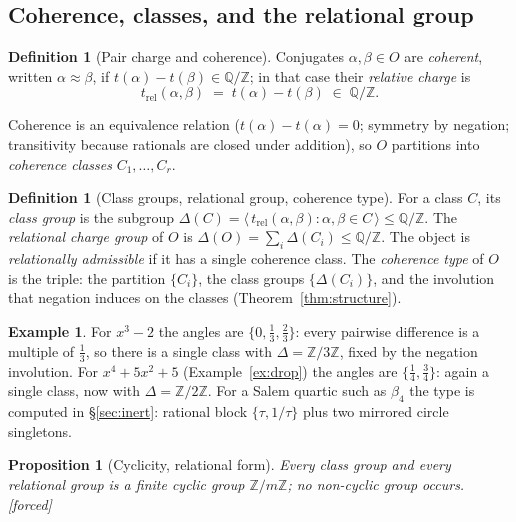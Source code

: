 \documentclass[11pt]{article}
\theoremstyle{plain}
\newtheorem{proposition}[theorem]{Proposition}
\theoremstyle{definition}
\newtheorem{definition}[theorem]{Definition}
\newtheorem{example}[theorem]{Example}
\theoremstyle{remark}
\newcommand{\Q}{\mathbb{Q}}
\newcommand{\Z}{\mathbb{Z}}
\newcommand{\tors}{\Q/\Z}
\newcommand{\F}{\textnormal{[forced]}}
\begin{document}
\subsection{Coherence, classes, and the relational group}

\begin{definition}[Pair charge and coherence]\label{def:pair}
Conjugates $\alpha,\beta\in O$ are \emph{coherent}, written $\alpha\approx\beta$,
if $t(\alpha)-t(\beta)\in\tors$; in that case their \emph{relative charge} is
\[
t_{\mathrm{rel}}(\alpha,\beta)\;=\;t(\alpha)-t(\beta)\;\in\;\tors .
\]
\end{definition}

Coherence is an equivalence relation ($t(\alpha)-t(\alpha)=0$; symmetry by
negation; transitivity because rationals are closed under addition), so $O$
partitions into \emph{coherence classes} $C_1,\dots,C_r$.

\begin{definition}[Class groups, relational group, coherence type]\label{def:type}
For a class $C$, its \emph{class group} is the subgroup
$\Delta(C)=\langle\,t_{\mathrm{rel}}(\alpha,\beta):\alpha,\beta\in
C\,\rangle\le\tors$. The \emph{relational charge group} of $O$ is
$\Delta(O)=\sum_i\Delta(C_i)\le\tors$. The object is \emph{relationally
admissible} if it has a single coherence class. The \emph{coherence type} of $O$
is the triple: the partition $\{C_i\}$, the class groups $\{\Delta(C_i)\}$, and
the involution that negation induces on the classes
(Theorem~\ref{thm:structure}).
\end{definition}

\begin{example}\label{ex:firsttype}
For $x^3-2$ the angles are $\{0,\tfrac13,\tfrac23\}$: every pairwise
difference is a multiple of $\tfrac13$, so there is a single class with
$\Delta=\Z/3\Z$, fixed by the negation involution. For $x^4+5x^2+5$
(Example~\ref{ex:drop}) the angles are $\{\tfrac14,\tfrac34\}$: again a
single class, now with $\Delta=\Z/2\Z$. For a Salem quartic such as
$\beta_4$ the type is computed in \S\ref{sec:inert}: rational block
$\{\tau,1/\tau\}$ plus two mirrored circle singletons.
\end{example}

\begin{proposition}[Cyclicity, relational form]\label{prop:cyclic}
Every class group and every relational group is a finite cyclic group $\Z/m\Z$;
no non-cyclic group occurs. \F
\end{proposition}
\end{document}
